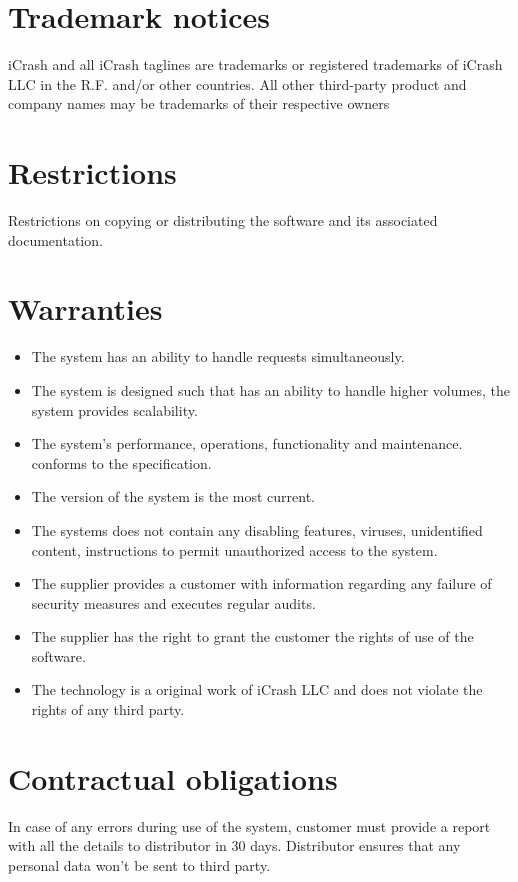 \section{Trademark notices}
iCrash and all iCrash taglines are trademarks or registered trademarks of iCrash LLC in the R.F. and/or other countries. All other third-party product and company names may be trademarks of their respective owners


\section{Restrictions}
Restrictions on copying or distributing the software and its associated
documentation.

\section{Warranties}
\begin{itemize}
  \item The system has an ability to handle requests simultaneously.
  \item The system is designed such that has an ability to handle higher
  volumes, the system provides scalability.
  \item The system's performance, operations, functionality and maintenance.
  conforms to the specification.
  \item The version of the system is the most current.
  \item The systems does not contain any disabling features, viruses,
  unidentified content, instructions to permit unauthorized access to the system.
  \item The supplier provides a customer with information regarding any failure
  of security measures and executes regular audits.
  \item The supplier has the right to grant the customer the rights of use of
  the software.
  \item The technology is a original work of iCrash LLC and does not violate the
  rights of any third party.
\end{itemize}

\section{Contractual obligations}
In case of any errors during use of the system, customer must provide a report with all the details to distributor in 30 days. 
Distributor ensures that any personal data won't be sent to third party.  


